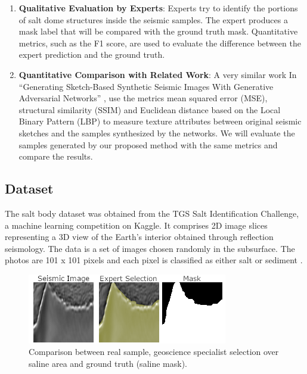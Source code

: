 \documentclass{ieeeaccess}
\begin{document}
\begin{enumerate}
    \item \textbf{Qualitative Evaluation by Experts}: Experts try to identify the portions of salt dome structures inside the seismic samples. The expert produces a mask label that will be compared with the ground truth mask. Quantitative metrics, such as the F1 score, are used to evaluate the difference between the expert prediction and the ground truth. 
    
    \item \textbf{Quantitative Comparison with Related Work}:
    A very similar work In “Generating Sketch-Based Synthetic Seismic Images With Generative Adversarial Networks” \cite{ref19}, use the metrics mean squared error (MSE), structural similarity (SSIM) and Euclidean distance based on the Local Binary Pattern (LBP) to measure texture attributes between original seismic sketches and the samples synthesized by the networks. We will evaluate the samples generated by our proposed method with the same metrics and compare the results.
\end{enumerate}

\subsection{Dataset}

The salt body dataset was obtained from the TGS Salt Identification Challenge, a machine learning competition on Kaggle. It comprises 2D image slices representing a 3D view of the Earth's interior obtained through reflection seismology. The data is a set of images chosen randomly in the subsurface. The photos are 101 x 101 pixels and each pixel is classified as either salt or sediment \cite{ref13}. 

\begin{figure}
    \centering
    \includegraphics[width=1\linewidth]{images/fig8.png}
    \caption{Comparison between real sample, geoscience specialist selection over saline area and ground truth (saline mask).}
    \label{fig:expert1}
\end{figure}
\end{document}
